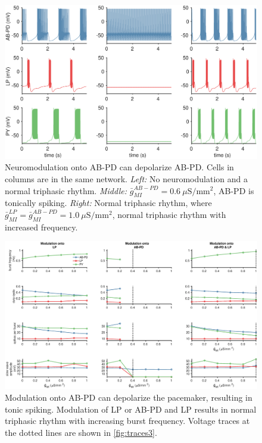 \FloatBarrier

\begin{figure}[t]
	\centering
	\includegraphics[width=1.0\linewidth]{gfx/all-modulation/traces3}
	\caption[Modulation of AB-PD depolarizes AB-PD (traces)]{Neuromodulation onto \acs{AB}-\acs{PD} can depolarize \acs{AB}-\acs{PD}. Cells in columns are in the same network. \textit{Left:} No neuromodulation and a normal triphasic rhythm. \textit{Middle:} $\bar{g}_{MI}^{AB-PD} = 0.6~\mu \mathrm{S/mm^2}$, \acs{AB}-\acs{PD} is tonically spiking. \textit{Right:} Normal triphasic rhythm, where $\bar{g}_{MI}^{LP} = \bar{g}_{MI}^{AB-PD} = 1.0~\mu \mathrm{S/mm^2}$, normal triphasic rhythm with increased frequency.}
	\label{fig:traces3}
\end{figure}

\begin{figure}[b]
	\centering
	\includegraphics[width=1.0\linewidth]{gfx/all-modulation/metrics3}
	\caption[Modulation of AB-PD depolarizes AB-PD (metrics)]{Modulation onto \acs{AB}-\acs{PD} can depolarize the pacemaker, resulting in tonic spiking. Modulation of \acs{LP} or \acs{AB}-\acs{PD} and \acs{LP} results in normal triphasic rhythm with increasing burst frequency. Voltage traces at the dotted lines are shown in \autoref{fig:traces3}.}
	\label{fig:metrics3}
\end{figure}

